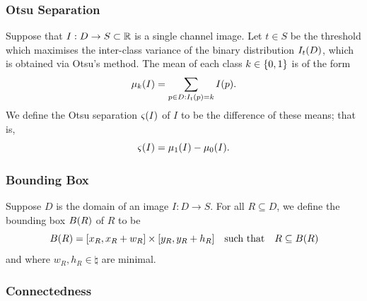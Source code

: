 \documentclass{article}
\begin{document}
\subsubsection*{Otsu Separation}

Suppose that $I : D \to S \subset \mathbb{R}$ is a single channel image.
Let $t \in S$ be the threshold which maximises the inter-class variance of
the binary distribution $I_{t}(D)$, which is obtained via Otsu's method.
The mean of each class $k \in \lbrace0, 1\rbrace$ is of the form
\begin{equation}
  \label{eq:def-otsu-mean}
  \mu_{k}(I)
  =
  \sum_{p \in D : I_{t}(p) = k}
  I(p)
  .
\end{equation}
We define the Otsu separation $\varsigma(I)$ of $I$ to be the difference of
these means; that is,
\begin{equation}
  \label{eq:def-otsu-separation}
  \varsigma(I)
  =
  \mu_{1}(I)
  -
  \mu_{0}(I)
  .
\end{equation}

\subsubsection*{Bounding Box}

Suppose $D$ is the domain of an image $I : D \to S$.
For all $R \subseteq D$, we define the bounding box $B(R)$ of $R$ to be
\begin{equation}
  \label{eq:def-bounding-box}
  B\lr{R}
  =
  \lrsq{x_{R}, x_{R} + w_{R}}
  \times
  \lrsq{y_{R}, y_{R} + h_{R}}
  \qq{such that}
  R \subseteq B\lr{R}
\end{equation}
and where $w_{R}, h_{R} \in \natural$ are minimal.

\subsubsection*{Connectedness}
\end{document}
